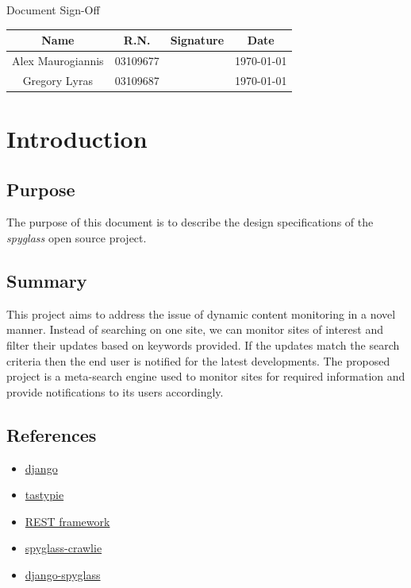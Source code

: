 




\tableofcontents

\pagebreak

\large{Document Sign-Off}

\begin{table}[h]
    \begin{tabular}{| c | c | c | c |}
        \hline
        Name & R.N. & Signature & Date \\
        \hline
        Alex Maurogiannis & 03109677 & & \today \\
        \hline
        Gregory Lyras & 03109687 & & \today \\
        \hline
    \end{tabular}
\end{table}

\chapter{Introduction}
    \section{Purpose}
        The purpose of this document is to describe the design specifications
        of the \emph{spyglass} open source project.
    \section{Summary}
        This project aims to address the issue of dynamic content monitoring
        in a novel manner. Instead of searching on one site, we can monitor
        sites of interest and filter their updates based on keywords provided.
        If the updates match the search criteria then the end user is notified
        for the latest developments. The proposed project is a meta-search
        engine used to monitor sites for required information and provide
        notifications to its users accordingly. 
    \section{References}
        \begin{itemize}
                \item \href{https://www.djangoproject.com/}{django}
                \item \href{http://tastypieapi.org/}{tastypie}
                \item
                    \href{https://en.wikipedia.org/wiki/Representational_state_transfer}{REST framework}
                \item \href{https://github.com/mastergreg/spyglass-crawlie}{spyglass-crawlie}
                \item \href{https://github.com/afein/django-spyglass}{django-spyglass}
        \end{itemize}

